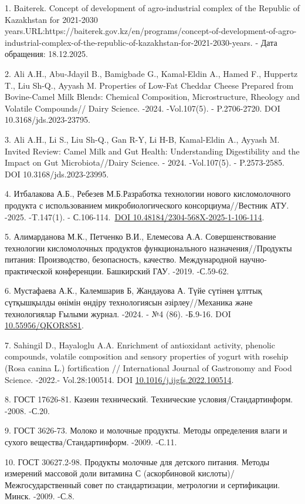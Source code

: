 \begin{refs}
1. Baiterek. Concept of development of agro-industrial complex of the
Republic of Kazakhstan for 2021-2030
years.URL:https://baiterek.gov.kz/en/programs/concept-of-development-of-agro-industrial-complex-of-the-republic-of-kazakhstan-for-2021-2030-years.
- Дата обращения: 18.12.2025.

2. Ali A.H., Abu-Jdayil B., Bamigbade G., Kamal-Eldin A., Hamed F.,
Huppertz T., Liu Sh-Q., Ayyash M. Properties of Low-Fat Cheddar Cheese
Prepared from Bovine-Camel Milk Blends: Chemical Composition,
Microstructure, Rheology and Volatile Compounds// Dairy Science. -2024.
-Vol.107(5). - P.2706-2720. DOI 10.3168/jds.2023-23795.

3. Ali A.H., Li S., Liu Sh-Q., Gan R-Y, Li H-B, Kamal-Eldin A., Ayyash
M. Invited Review: Camel Milk and Gut Health: Understanding
Digestibility and the Impact on Gut Microbiota//Dairy Science. - 2024.
-Vol.107(5). - P.2573-2585. DOI 10.3168/jds.2023-23995.

4. Итбалакова А.Б., Ребезев М.Б.Разработка технологии нового
кисломолочного продукта с использованием микробиологического
консорциума//Вестник АТУ. -2025. -T.147(1). -
С.106-114.~\href{https://doi.org/10.48184/2304-568X-2025-1-106-114}{DOI
10.48184/2304-568X-2025-1-106-114}.

5. Алимарданова М.К., Петченко В.И., Елемесова А.А. Совершенствование
технологии кисломолочных продуктов функционального назначения//Продукты
питания: Производство, безопасность, качество. Международной
научно-практической конференции. Башкирский ГАУ. -2019. -С.59-62.

6. Мустафаева А.К., Калемшарив Б, Жандауова А. Түйе сүтінен ұлттық
сүтқышқылды өнімін өндіру технологиясын әзірлеу//Механика және
технологиялар Ғылыми журнал. -2024. - №4 (86). -Б.9-16. DOI
\href{https://doi.org/10.55956/QKOR8581}{10.55956/QKOR8581}.

7. Sahingil D., Hayaloglu A.A. Enrichment of antioxidant activity,
phenolic compounds, volatile composition and sensory properties of
yogurt with rosehip (Rosa canina L.) fortification // International
Journal of Gastronomy and Food Science. -2022.- Vol.28:100514. DOI
\href{https://doi.org/10.1016/j.ijgfs.2022.100514}{10.1016/j.ijgfs.2022.100514}.

8. ГОСТ 17626-81. Казеин технический. Технические
условия/Стандартинформ. -2008. -С.20.

9. ГОСТ 3626-73. Молоко и молочные продукты. Методы определения влаги и
сухого вещества/Стандартинформ. -2009. -С.11.

10. ГОСТ 30627.2-98. Продукты молочные для детского питания. Методы
измерений массовой доли витамина С (аскорбиновой кислоты)/
Межгосударственный совет по стандартизации, метрологии и сертификации.
Минск. -2009. -С.8.
\end{refs}

